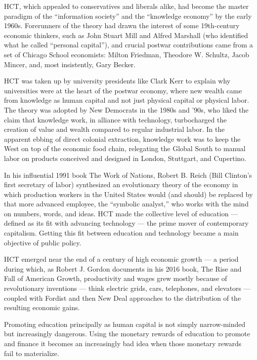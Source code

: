 \documentclass[
]{book}
\begin{document}
HCT, which appealed to conservatives and liberals alike, had become the master paradigm of the ``information society'' and the ``knowledge economy'' by the early 1960s. Forerunners of the theory had drawn the interest of some 19th-century economic thinkers, such as John Stuart Mill and Alfred Marshall (who identified what he called ``personal capital''), and crucial postwar contributions came from a set of Chicago School economists: Milton Friedman, Theodore W. Schultz, Jacob Mincer, and, most insistently, Gary Becker.

HCT was taken up by university presidents like Clark Kerr to explain why universities were at the heart of the postwar economy, where new wealth came from knowledge as human capital and not just physical capital or physical labor. The theory was adopted by New Democrats in the 1980s and '90s, who liked the claim that knowledge work, in alliance with technology, turbocharged the creation of value and wealth compared to regular industrial labor. In the apparent ebbing of direct colonial extraction, knowledge work was to keep the West on top of the economic food chain, relegating the Global South to manual labor on products conceived and designed in London, Stuttgart, and Cupertino.

In his influential 1991 book The Work of Nations, Robert B. Reich (Bill Clinton's first secretary of labor) synthesized an evolutionary theory of the economy in which production workers in the United States would (and should) be replaced by that more advanced employee, the ``symbolic analyst,'' who works with the mind on numbers, words, and ideas. HCT made the collective level of education --- defined as its fit with advancing technology --- the prime mover of contemporary capitalism. Getting this fit between education and technology became a main objective of public policy.

HCT emerged near the end of a century of high economic growth --- a period during which, as Robert J. Gordon documents in his 2016 book, The Rise and Fall of American Growth, productivity and wages grew mostly because of revolutionary inventions --- think electric grids, cars, telephones, and elevators --- coupled with Fordist and then New Deal approaches to the distribution of the resulting economic gains.

Promoting education principally as human capital is not simply narrow-minded but increasingly dangerous. Using the monetary rewards of education to promote and finance it becomes an increasingly bad idea when those monetary rewards fail to materialize.
\end{document}
